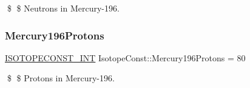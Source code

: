 \$ \$ Neutrons in Mercury-\/196. \mbox{\label{group___isotope_const-_mercury-_hg196_gae108bae39ff0270cfdb4c59f2c3948c7}} 
\subsubsection{\texorpdfstring{Mercury196\+Protons}{Mercury196Protons}}
{\footnotesize\ttfamily \mbox{\hyperlink{group___isotope_const-_macros_ga5f18360b3e99483a35c32d789e62621c}{I\+S\+O\+T\+O\+P\+E\+C\+O\+N\+S\+T\+\_\+\+I\+NT}} Isotope\+Const\+::\+Mercury196\+Protons = 80}

\$ \$ Protons in Mercury-\/196. 